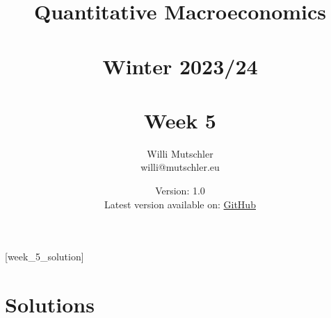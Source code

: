 
\newif\ifDisplaySolutions\DisplaySolutionstrue


\title{Quantitative Macroeconomics\\~\\Winter 2023/24\\~\\Week 5}
\author{Willi Mutschler\\willi@mutschler.eu}
\date{Version: 1.0\\Latest version available on: \href{https://github.com/wmutschl/Quantitative-Macroeconomics/releases/latest/download/week_5.pdf}{GitHub}}
\maketitle\thispagestyle{empty}

\newpage
{}[week_5_solution]
\tableofcontents\thispagestyle{empty}\newpage

\setcounter{page}{1}
\newpage
\newpage
\newpage
\printbibliography
\newpage

\ifDisplaySolutions
\newpage
\appendix
\section{Solutions}

\fi
